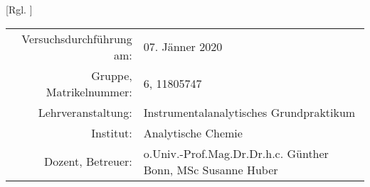 [Rgl. ]{}{}
  
\maketitle %
  
\begin{center}
  \begin{tabular}{r p{4cm}}
    Versuchsdurchführung am: & 07. Jänner 2020\\ %
    Gruppe, Matrikelnummer: & 6, 11805747 \\
    Lehrveranstaltung: & Instrumentalanalytisches Grundpraktikum \\
    Institut: & Analytische Chemie \\
    Dozent, Betreuer: & o.Univ.-Prof.Mag.Dr.Dr.h.c. Günther Bonn, MSc Susanne Huber %
  \end{tabular}
\end{center}

\begin{abstract}
  
\end{abstract}